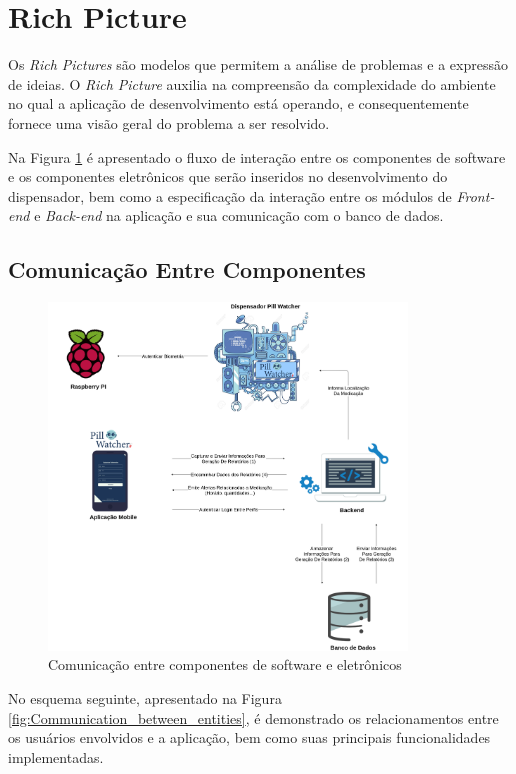 \section{Rich Picture}
\label{richpiture_software}

Os \textit{Rich Pictures} são modelos que permitem a análise de problemas e a expressão de ideias. O \textit{Rich Picture} auxilia na compreensão da complexidade do ambiente no qual a aplicação de desenvolvimento está operando, e consequentemente fornece uma visão geral do problema a ser resolvido.


Na Figura \ref{fig:Communication_between_components} é apresentado o fluxo de interação entre os componentes de software e os componentes eletrônicos que serão inseridos no desenvolvimento do dispensador, bem como a especificação da interação entre os módulos de \textit{Front-end} e \textit{Back-end} na aplicação e sua comunicação com o banco de dados.

\subsection{Comunicação Entre Componentes}
\begin{figure}[H]
    \centering
    \includegraphics[width=0.85\textwidth]{figuras/Comunicação Entre Componentes.png}
    \caption{Comunicação entre componentes de software e eletrônicos}
    \label{fig:Communication_between_components}
\end{figure}

No esquema seguinte, apresentado na Figura \ref{fig:Communication_between_entities}, é demonstrado os relacionamentos entre os usuários envolvidos e a aplicação, bem como suas principais funcionalidades implementadas.


